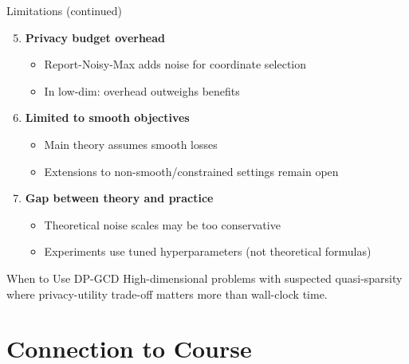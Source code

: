 \documentclass[10pt]{beamer}
\begin{document}
\begin{frame}{Limitations (continued)}
\begin{enumerate}
\setcounter{enumi}{4}
\item \textbf{Privacy budget overhead}
\begin{itemize}
\item Report-Noisy-Max adds noise for coordinate selection
\item In low-dim: overhead outweighs benefits
\end{itemize}

\item \textbf{Limited to smooth objectives}
\begin{itemize}
\item Main theory assumes smooth losses
\item Extensions to non-smooth/constrained settings remain open
\end{itemize}

\item \textbf{Gap between theory and practice}
\begin{itemize}
\item Theoretical noise scales may be too conservative
\item Experiments use tuned hyperparameters (not theoretical formulas)
\end{itemize}
\end{enumerate}

\vspace{1em}
\begin{block}{When to Use DP-GCD}
High-dimensional problems with suspected quasi-sparsity where privacy-utility trade-off matters more than wall-clock time.
\end{block}
\end{frame}

\section{Connection to Course}
\end{document}
